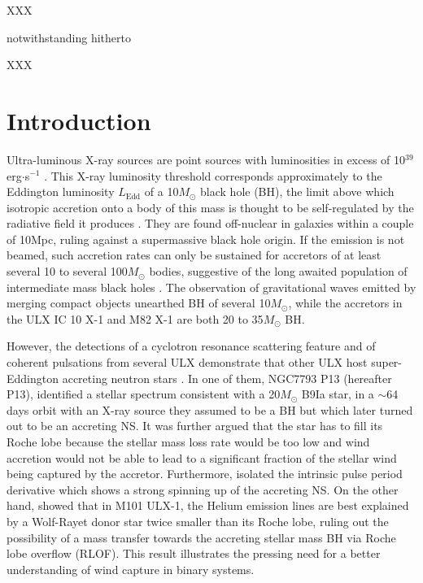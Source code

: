 \documentclass[letter]{aa}
\makeatletter
\newcommand*{\rlof}{RLOF\@\xspace}
\newcommand*{\ns}{NS\@\xspace}
\newcommand*{\bh}{BH\@\xspace}
\newcommand*{\msun}{$M_{\odot}$\@\xspace}
\newcommand*{\ledd}{$L_{\text{Edd}}$\@\xspace}
\makeatother
\begin{document}

   \maketitle
%

XXX

notwithstanding
hitherto

XXX

\section{Introduction}

Ultra-luminous X-ray sources are point sources with luminosities in excess of 10$^{39}$erg$\cdot$s$^{-1}$ \citep[see][for a recent review]{Kaaret2017}. This X-ray luminosity threshold corresponds approximately to the Eddington luminosity \ledd of a 10\msun black hole (\bh), the limit above which isotropic accretion onto a body of this mass is thought to be self-regulated by the radiative field it produces \citep{Rappaport2005}. They are found off-nuclear in galaxies within a couple of 10Mpc, ruling against a supermassive black hole origin. If the emission is not beamed, such accretion rates can only be sustained for accretors of at least several 10 to several 100\msun bodies, suggestive of the long awaited population of intermediate mass black holes \citep{Colbert1999}. The observation of gravitational waves emitted by merging compact objects unearthed \bh of several 10\msun, while the accretors in the ULX IC 10 X-1 \citep{Brandt1997,Prestwich2007,Silverman2008} and M82 X-1 \citep{Brightman2016} are both 20 to 35\msun \bh. 

However, the detections of a cyclotron resonance scattering feature and of coherent pulsations from several ULX demonstrate that other ULX host super-Eddington accreting neutron stars \citep[\ns][]{Bachetti2014,Furst2016,Israel2017,Carpano2018,Brightman2018}. In one of them, NGC7793 P13 (hereafter P13), \cite{Motch2014} identified a stellar spectrum consistent with a 20\msun B9Ia star, in a $\sim$64 days orbit with an X-ray source they assumed to be a \bh but which later turned out to be an accreting \ns \citep{Furst2016}. It was further argued that the star has to fill its Roche lobe because the stellar mass loss rate would be too low and wind accretion would not be able to lead to a significant fraction of the stellar wind being captured by the accretor. Furthermore, \cite{Fuerst2018} isolated the intrinsic pulse period derivative which shows a strong spinning up of the accreting \ns. On the other hand, \citep{Liu2013} showed that in M101 ULX-1, the Helium emission lines are best explained by a Wolf-Rayet donor star twice smaller than its Roche lobe, ruling out the possibility of a mass transfer towards the accreting stellar mass \bh via Roche lobe overflow (\rlof). This result illustrates the pressing need for a better understanding of wind capture in binary systems.
\end{document}
